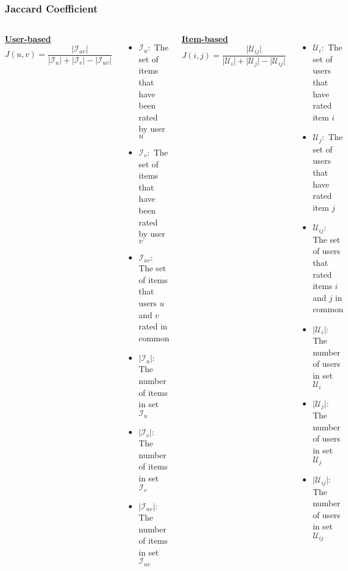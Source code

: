 \begin{frame}
    \frametitle{Jaccard Coefficient}
    \begin{columns}
        \centering
        \underline{\textbf{User-based}}
        \begin{equation*}
    J(u,v) = \frac{\mathopen|\mathcal{I}_{uv}\mathclose|}
                  {\mathopen|\mathcal{I}_{u}\mathclose| +
		   \mathopen|\mathcal{I}_{v}\mathclose| -
		   \mathopen|\mathcal{I}_{uv}\mathclose|}
       \end{equation*}
        \tiny
        \begin{itemize}
            \item $\mathcal{I}_{u}:$ The set of items that have been rated by user $u$
            \item $\mathcal{I}_{v}:$ The set of items that have been rated by user $v$
            \item $\mathcal{I}_{uv}:$ The set of items that users $u$ and $v$ rated in common
            \item $\mathopen|\mathcal{I}_{u}\mathclose|:$ The number of items in set $\mathcal{I}_{u}$
            \item $\mathopen|\mathcal{I}_{v}\mathclose|:$ The number of items in set $\mathcal{I}_{v}$
            \item $\mathopen|\mathcal{I}_{uv}\mathclose|:$ The number of items in set $\mathcal{I}_{uv}$
        \end{itemize}
        \centering
        \underline{\textbf{Item-based}}
        \begin{equation*}
    J(i,j) = \frac{\mathopen|\mathcal{U}_{ij}\mathclose|}
                  {\mathopen|\mathcal{U}_{i}\mathclose| +
		   \mathopen|\mathcal{U}_{j}\mathclose| -
		   \mathopen|\mathcal{U}_{ij}\mathclose|}
       \end{equation*}
        \tiny
        \begin{itemize}
            \item $\mathcal{U}_{i}:$ The set of users that have rated item $i$
            \item $\mathcal{U}_{j}:$ The set of users that have rated item $j$
            \item $\mathcal{U}_{ij}:$ The set of users that rated items $i$ and $j$ in common
            \item $\mathopen|\mathcal{U}_{i}\mathclose|:$ The number of users in set $\mathcal{U}_{i}$
            \item $\mathopen|\mathcal{U}_{j}\mathclose|:$ The number of users in set $\mathcal{U}_{j}$
            \item $\mathopen|\mathcal{U}_{ij}\mathclose|:$ The number of users in set $\mathcal{U}_{ij}$
        \end{itemize}
    \end{columns}
\end{frame}
